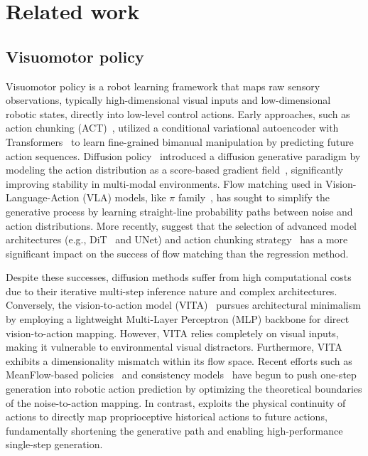 \section{Related work}

\subsection{Visuomotor policy}
Visuomotor policy is a robot learning framework that maps raw sensory observations, typically high-dimensional visual inputs and low-dimensional robotic states, directly into low-level control actions. Early approaches, such as action chunking (ACT)~\citep{zhao2023learning}, utilized a conditional variational autoencoder with Transformers~\citep{vaswani2017attention} to learn fine-grained bimanual manipulation by predicting future action sequences. Diffusion policy~\citep{dp} introduced a diffusion generative paradigm by modeling the action distribution as a score-based gradient field~\citep{ddpm, song2020score}, significantly improving stability in multi-modal environments. Flow matching \citep{flowmatching} used in Vision-Language-Action (VLA) models, like $\pi$ family~\citep{intelligence2025pi,intelligence2025pi05, black2024pi_0}, has sought to simplify the generative process by learning straight-line probability paths between noise and action distributions. More recently, \citet{pan2025much} suggest that the selection of advanced model architectures (e.g., DiT~\citep{Peebles_2023_ICCV} and UNet\citep{dp}) and action chunking strategy~\citep{zhao2023learning} has a more significant impact on the success of flow matching than the regression method.

Despite these successes, diffusion methods suffer from high computational costs due to their iterative multi-step inference nature and complex architectures. Conversely, the vision-to-action model (VITA)~\citep{gao2025vita} pursues architectural minimalism by employing a lightweight Multi-Layer Perceptron (MLP) backbone for direct vision-to-action mapping. However, VITA relies completely on visual inputs, making it vulnerable to environmental visual distractors. Furthermore, VITA exhibits a dimensionality mismatch within its flow space. Recent efforts such as MeanFlow-based policies~\citep{fang2025omp, geng2025mean} and consistency models~\citep{zhang2025flowpolicy,li2026ofp, Consistency} have begun to push one-step generation into robotic action prediction by optimizing the theoretical boundaries of the noise-to-action mapping. In contrast, \m{} exploits the physical continuity of actions to directly map proprioceptive historical actions to future actions, fundamentally shortening the generative path and enabling high-performance single-step generation.

